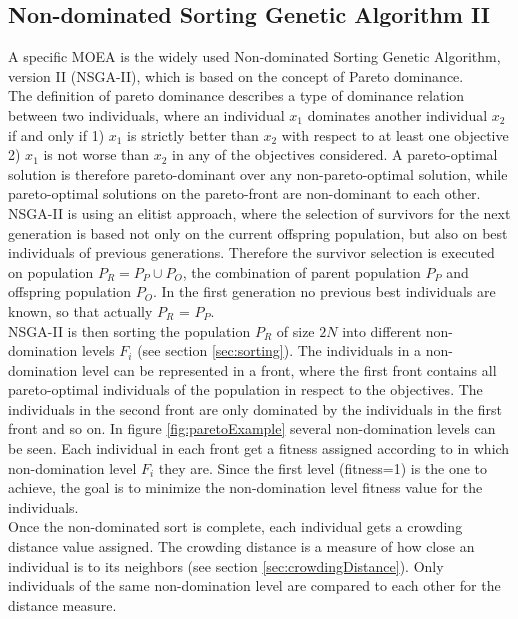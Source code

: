     \subsection{Non-dominated Sorting Genetic Algorithm II}
    \label{sec:nsga2}
    A specific MOEA is the widely used Non-dominated Sorting Genetic Algorithm, version II (NSGA-II)\cite{Deb:2002}, which is based on the concept of Pareto dominance.\\
    The definition of pareto dominance describes a type of dominance relation between two individuals, where an individual $x_1$ dominates another individual $x_2$ if and only if 1) $x_1$ is strictly better than $x_2$ with respect to at least one objective 2) $x_1$ is not worse than $x_2$ in any of the objectives considered\cite{clune2013evolutionary}. A pareto-optimal solution is therefore pareto-dominant over any non-pareto-optimal solution, while pareto-optimal solutions on the pareto-front are non-dominant to each other.\\
    NSGA-II is using an elitist approach, where the selection of survivors for the next generation is based not only on the current offspring population, but also on best individuals of previous generations. Therefore the survivor selection is executed on population $P_R = P_P \cup P_O$, the combination of parent population $P_P$ and offspring population $P_O$. In the first generation no previous best individuals are known, so that actually $P_R$ = $P_P$.\\
    NSGA-II is then sorting the population $P_R$ of size $2N$ into different non-domination levels $F_i$ (see section \ref{sec:sorting}). The individuals in a non-domination level can be represented in a front, where the first front contains all pareto-optimal individuals of the population in respect to the objectives. The individuals in the second front are only dominated by the individuals in the first front and so on. In figure \ref{fig:paretoExample} several non-domination levels can be seen. Each individual in each front get a fitness assigned according to in which non-domination level $F_i$ they are. Since the first level (fitness=1) is the one to achieve, the goal is to minimize the non-domination level fitness value for the individuals.\\
    Once the non-dominated sort is complete, each individual gets a crowding distance value assigned. The crowding distance is a measure of how close an individual is to its neighbors (see section \ref{sec:crowdingDistance}). Only individuals of the same non-domination level are compared to each other for the distance measure.\\
